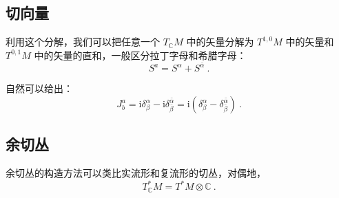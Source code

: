 \subsection{切向量}
利用这个分解，我们可以把任意一个 $T_\mathbb C M$ 中的矢量分解为 $T^{1, 0} M$ 中的矢量和 $T^{0, 1} M$ 中的矢量的直和，一般区分拉丁字母和希腊字母：
\begin{equation}
S^a = S^\alpha + S^{\bar \alpha} ~.
\end{equation}

自然可以给出：
\begin{equation}
J^a_b = \mathrm i \delta^\alpha_\beta - \mathrm i \delta^{\bar \alpha}_{\bar \beta} = \mathrm i(\delta^\alpha_\beta - \delta^{\bar \alpha}_{\bar \beta} )~.
\end{equation}

\subsection{余切丛}
余切丛的构造方法可以类比实流形和复流形的切丛，对偶地，
\begin{equation}
T^*_\mathbb C M = T^* M \otimes \mathbb C ~.
\end{equation}

